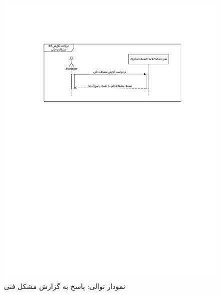 \begin{figure}[ht!]
	\centering
	\includegraphics[scale=0.8, page=2]{figs/OOD-Sequence-39-40.pdf}
	\caption{نمودار توالی: پاسخ به گزارش مشکل فنی}
\end{figure}
\FloatBarrier
\newpage

